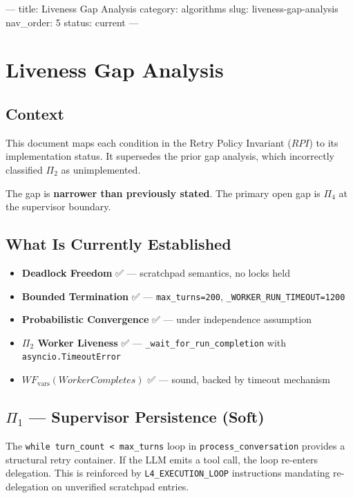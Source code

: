 ---
title: Liveness Gap Analysis
category: algorithms
slug: liveness-gap-analysis
nav_order: 5
status: current
---

\section{Liveness Gap Analysis}

\subsection*{Context}

This document maps each condition in the Retry Policy Invariant ($RPI$) to
its implementation status. It supersedes the prior gap analysis, which
incorrectly classified $\Pi_2$ as unimplemented.

The gap is \textbf{narrower than previously stated}. The primary open gap
is $\Pi_4$ at the supervisor boundary.

\subsection*{What Is Currently Established}

\begin{itemize}
  \item \textbf{Deadlock Freedom} ✅ — scratchpad semantics, no locks held
  \item \textbf{Bounded Termination} ✅ — \texttt{max\_turns=200}, \texttt{\_WORKER\_RUN\_TIMEOUT=1200}
  \item \textbf{Probabilistic Convergence} ✅ — under independence assumption
  \item \textbf{$\Pi_2$ Worker Liveness} ✅ — \texttt{\_wait\_for\_run\_completion} with \texttt{asyncio.TimeoutError}
  \item \textbf{$WF_{\text{vars}}(WorkerCompletes)$} ✅ — sound, backed by timeout mechanism
\end{itemize}

\subsection*{$\Pi_1$ — Supervisor Persistence (Soft)}

The \texttt{while turn\_count < max\_turns} loop in \texttt{process\_conversation}
provides a structural retry container. If the LLM emits a tool call, the loop
re-enters delegation. This is reinforced by \texttt{L4\_EXECUTION\_LOOP} instructions
mandating re-delegation on unverified scratchpad entries.

